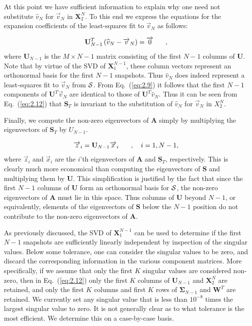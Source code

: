 \documentclass[12pt]{article}
\newcommand{\fn}[1]{\left( #1 \right)}
\renewcommand{\vec}[1]{\overrightarrow{#1}}
\newcommand{\be}{\begin{equation}}
\newcommand{\ee}{\end{equation}}
\newcommand{\pec}{\hspace{0.25in},}
\newcommand{\LEQ}[1]{\label{eq:#1}}
\newcommand{\EQ}[1]{Eq.~(\ref{eq:#1})}
\newcommand{\cS}{{\cal S}}
\newcommand{\mA}{\mathbf{A}}
\newcommand{\mX}{\mathbf{X}}
\newcommand{\mU}{\mathbf{U}}
\newcommand{\mW}{\mathbf{W}}
\newcommand{\mSigma}{\mathbf{\Sigma}}
\newcommand{\mS}{\mathbf{S}}
\begin{document}
At this point we have sufficient information to explain why one need not 
 substitute $\widehat{v}_N$ for $\vec{v}_N$ in $\mX_2^{N}$.  
To this end we express the equations for the expansion coefficients of the 
 least-squares fit to $\vec{v}_N$ as follows:
 
\be
	\mU^T_{N-1}\fn{\widehat{v}_N - \vec{v}_N} = \vec{0} \pec
	\LEQ{2.9}
\ee
where $\mU_{N-1}$ is the $M \times N-1$ matrix consisting of the first $N-1$ 
 columns of $\mU$. Note that by virtue of the SVD of $\mX_{1}^{N-1}$, these 
 column vectors represent an orthonormal basis for the first $N-1$ snapshots.  
Thus $\widehat{v}_N$ does indeed represent a least-squares fit to $\vec{v}_N$ from $\cS$.  
From \EQ{2.9} it follows that the first $N-1$ components of $\mU^T \vec{v}_N$ 
 are identical to those of $\mU^T \widehat{v}_N$. 
Thus it can be seen from \EQ{2.12} that $\mS_T$ is invariant to the 
 substitution of $\widehat{v}_N$ for $\vec{v}_N$ in $X_{2}^{N}$.

Finally, we compute the non-zero eigenvectors of $\mA$ simply by multiplying 
 the eigenvectors of $\mS_T$ by $U_{N-1}$. 

\be
	\vec{z}_i = \mU_{N-1} \vec{x}_i \pec \quad i=1,N-1,
	\LEQ{2.13}
\ee
where $\vec{z}_i$ and $\vec{x}_i$ are the $i$'th eigenvectors of $\mA$ and $\mS_T$, respectively.  
This is clearly much more economical than computing the eigenvectors of $\mS$ 
 and multiplying them by $\mU$.  
This simplification is justified by the fact that since the first $N-1$ columns 
 of $\mU$ form an orthonormal basis for $\cS$, the non-zero eigenvectors of 
 $\mA$ must lie in this space.  
Thus columns of $\mU$ beyond $N-1$, or equivalently, elements of the 
 eigenvectors of $\mS$ below the $N-1$ position do not contribute to the non-zero eigenvectors of $\mA$. 

As previously discussed, the SVD of $\mX_{1}^{N-1}$ can be used to determine if 
 the first $N-1$ snapshots are sufficiently linearly independent by inspection 
 of the singular values.  
Below some tolerance, one can consider the singular values to be zero, and 
 discard the corresponding information in the various component matrices. 
More specifically, if we assume that only the first $K$ singular values are 
 considered non-zero, then in \EQ{2.12} only the first $K$ columns of 
 $\mU_{N-1}$ and $\mX_{2}^{N}$ are retained, and only the first $K$ columns and 
 first $K$ rows of $\mSigma_{N-1}$ and $\mW^T$ are retained.  
We currently set any singular value that is less than $10^{-8}$ times the 
 largest singular value to zero. 
It is not generally clear as to what tolerance is the most efficient.  
We determine this on a case-by-case basis.
\end{document}
